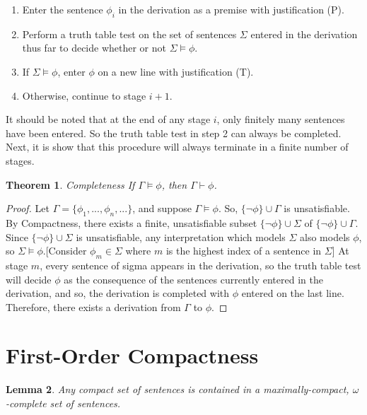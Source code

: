 \documentclass[12pt]{article}
\newtheorem{theorem}{Theorem}[section]
\newtheorem{lemma}[theorem]{Lemma}
\theoremstyle{definition}
\theoremstyle{remark}
\begin{document}
\begin{enumerate}
	\item Enter the sentence $\phi_i$ in the derivation as a premise with justification (P).
	\item Perform a truth table test on the set of sentences $\Sigma$ entered in the derivation thus far to decide whether or not $\Sigma \models \phi$.
	\item If $\Sigma \models \phi$, enter $\phi$ on a new line with justification (T).
	\item Otherwise, continue to stage $i+1$.
\end{enumerate}

It should be noted that at the end of any stage $i$, only finitely many sentences have been entered. So the truth table test in step 2 can always be completed. Next, it is show that this procedure will always terminate in a finite number of stages.

\begin{theorem}{Completeness}
	If $\Gamma \models \phi$, then $\Gamma \vdash \phi$.
\end{theorem}

\begin{proof}
	Let $\Gamma = \{ \phi_1, ..., \phi_n, ... \}$, and suppose $\Gamma \models \phi$. So, $\{ \neg\phi \} \cup \Gamma$ is unsatisfiable. By Compactness, there exists a finite, unsatisfiable subset $\{ \neg\phi \} \cup \Sigma$ of $\{ \neg\phi \} \cup \Gamma$. Since $\{ \neg\phi \} \cup \Sigma$ is unsatisfiable, any interpretation which models $\Sigma$ also models $\phi$, so $\Sigma \models \phi$.[Consider $\phi_m \in \Sigma$ where $m$ is the highest index of a sentence in $\Sigma$] At stage $m$, every sentence of sigma appears in the derivation, so the truth table test will decide $\phi$ as the consequence of the sentences currently entered in the derivation, and so, the derivation is completed with $\phi$ entered on the last line. Therefore, there exists a derivation from $\Gamma$ to $\phi$.
\end{proof}

\section{First-Order Compactness}

\begin{lemma}
	\label{lem:pred-maximal}
	Any compact set of sentences is contained in a maximally-compact, $\omega$-complete set of sentences.
\end{lemma}
\end{document}
